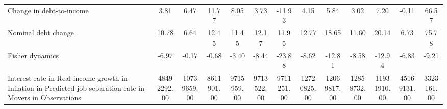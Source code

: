 \begin{table}[htbp]
\begin{tabular}{lcccccccccccc}
Change in debt-to-income &         3.81 &         6.47 &        11.77 &         8.05 &         3.73 &       -11.93 &         4.15 &         5.84 &         3.02 &         7.20 &        -0.11 &        66.57 \\  
Nominal debt change &        10.78 &         6.64 &        12.45 &        11.45 &        12.17 &        11.95 &        12.77 &        18.65 &        11.60 &        20.14 &         6.73 &        75.78 \\  
Fisher dynamics &        -6.97 &        -0.17 &        -0.68 &        -3.40 &        -8.44 &       -23.88 &        -8.62 &       -12.81 &        -8.58 &       -12.94 &        -6.83 &        -9.21 \\  
Interest rate in %
Real income growth in %
Inflation in %
Predicted job separation rate in %
Movers in %
Observations &  48492292.00 &  10739659.00 &   8611901.00 &   9715959.00 &   9713522.00 &   9711251.00 &  12720825.00 &  12069817.00 &  12858732.00 &  11931910.00 &  45169131.00 &   3323161.00 \\  
\hline \hline \end{tabular}
\end{table}
